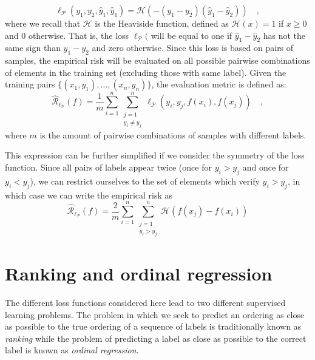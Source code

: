 $$
\ell_{\mathcal{P}}(y_1, y_2, \hat{y}_1, \hat{y}_1) = \mathcal{H}(- (y_1-y_2) (\hat{y}_1 - \hat{y}_2)) \quad,
$$
where we recall that $\mathcal{H}$ is the Heaviside function, defined as $\mathcal{H}(x) = 1$ if $x \geq 0$ and $0$ otherwise. That is, the loss $\ell_{\mathcal{P}}($ will be equal to one if $\hat{y}_1 - \hat{y}_2$ has not the same sign than $y_1 - y_2$ and zero otherwise. Since this loss is based on pairs of samples, the empirical risk will be evaluated on all possible pairwise combinations of elements in the training set (excluding those with same label). Given the training pairs $\{(x_1, y_1), \ldots, (x_n, y_n)\}$, the evaluation metric is defined as:
\begin{equation*}
\hat{\mathcal{R}}_{\ell_{\mathcal{P}}}(f) = \frac{1}{m} \sum_{i=1}^n \sum_{\substack{j=1\\  y_i \neq y_j}}^n \ell_{\mathcal{P}}(y_i, y_j, f(x_i), f(x_j)) \quad ,
\end{equation*}
where $m$ is the amount of pairwise combinations of samples with different labels.



This expression can be further simplified if we consider the symmetry of the loss function. Since all pairs of labels appear twice (once for $y_i > y_j$ and once for $y_i < y_j$), we can restrict ourselves to the set of elements which verify $y_i > y_j$, in which case we can write the empirical risk as
\begin{equation}\label{eq:risk_pairwise}
\hat{\mathcal{R}}_{\ell_{\mathcal{P}}}(f) =  \frac{2}{m}\sum_{i=1}^n \sum_{\substack{j=1\\  y_i > y_j}}^n \mathcal{H}(f(x_j) - f(x_i))
\end{equation}


\section{Ranking and ordinal regression}

The different loss functions considered here lead to two different supervised learning problems. The problem in which we seek to predict an ordering as close as possible to the true ordering of a sequence of labels is traditionally known as \emph{ranking} while the problem of predicting a label as close as possible to the correct label is known as \emph{ordinal regression}.

